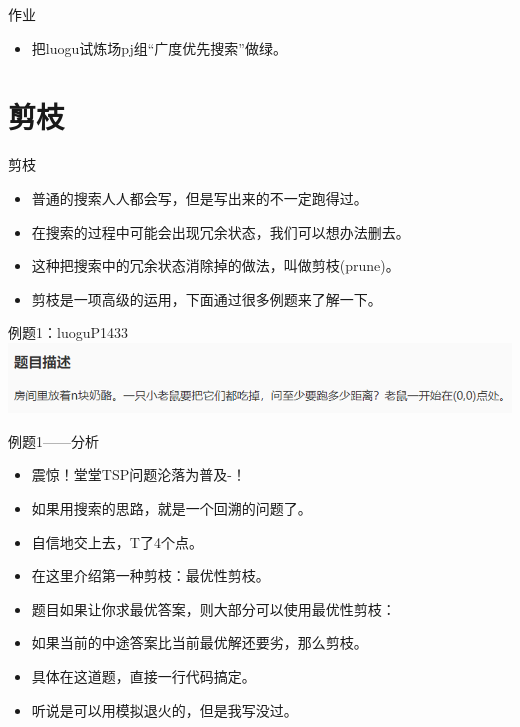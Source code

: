 \documentclass{bemaer}[UTF-8]
\begin{document}
\begin{frame}{作业}
\begin{itemize}
  \item 把luogu试炼场pj组“广度优先搜索”做绿。
\end{itemize}
\end{frame}

\section{剪枝}

\begin{frame}{剪枝}
\begin{itemize}
\item 普通的搜索人人都会写，但是写出来的不一定跑得过。
\item 在搜索的过程中可能会出现冗余状态，我们可以想办法删去。
\item 这种把搜索中的冗余状态消除掉的做法，叫做剪枝(prune)。
\item 剪枝是一项高级的运用，下面通过很多例题来了解一下。
\end{itemize}
\end{frame}

\begin{frame}{例题1：luoguP1433}
\includegraphics{luoguP1433.png}
\end{frame}

\begin{frame}{例题1——分析}
\begin{itemize}
  \item 震惊！堂堂TSP问题沦落为普及-！
  \item 如果用搜索的思路，就是一个回溯的问题了。
  \item 自信地交上去，T了4个点。
  \item 在这里介绍第一种剪枝：最优性剪枝。
  \item 题目如果让你求最优答案，则大部分可以使用最优性剪枝：
  \item 如果当前的中途答案比当前最优解还要劣，那么剪枝。
  \item 具体在这道题，直接一行代码搞定。
  \item 听说是可以用模拟退火的，但是我写没过。
\end{itemize}
\end{frame}
\end{document}
